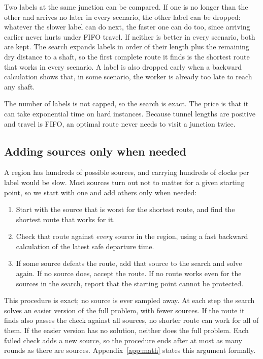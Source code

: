 \documentclass[11pt,a4paper]{article}
\begin{document}
Two labels at the same junction can be compared. If one is no longer than the other and arrives no later in every scenario, the other label can be dropped: whatever the slower label can do next, the faster one can do too, since arriving earlier never hurts under FIFO travel. If neither is better in every scenario, both are kept. The search expands labels in order of their length plus the remaining dry distance to a shaft, so the first complete route it finds is the shortest route that works in every scenario. A label is also dropped early when a backward calculation shows that, in some scenario, the worker is already too late to reach any shaft.

The number of labels is not capped, so the search is exact. The price is that it can take exponential time on hard instances. Because tunnel lengths are positive and travel is FIFO, an optimal route never needs to visit a junction twice.

\subsection{Adding sources only when needed}
A region has hundreds of possible sources, and carrying hundreds of clocks per label would be slow. Most sources turn out not to matter for a given starting point, so we start with one and add others only when needed:
\begin{enumerate}
\item Start with the source that is worst for the shortest route, and find the shortest route that works for it.
\item Check that route against \emph{every} source in the region, using a fast backward calculation of the latest safe departure time.
\item If some source defeats the route, add that source to the search and solve again. If no source does, accept the route. If no route works even for the sources in the search, report that the starting point cannot be protected.
\end{enumerate}
This procedure is exact; no source is ever sampled away. At each step the search solves an easier version of the full problem, with fewer sources. If the route it finds also passes the check against all sources, no shorter route can work for all of them. If the easier version has no solution, neither does the full problem. Each failed check adds a new source, so the procedure ends after at most as many rounds as there are sources. Appendix~\ref{app:math} states this argument formally.
\end{document}
